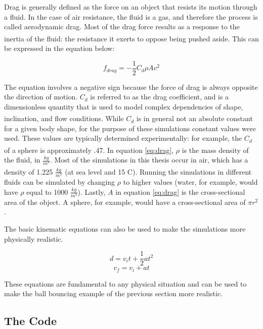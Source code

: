 Drag is generally defined as the force on an object that resists its motion through a fluid.  In the case of air resistance, the fluid is a gas, and therefore the process is called aerodynamic drag.  Most of the drag force results as a response to the inertia of the fluid: the resistance it exerts to oppose being pushed aside.\textsuperscript{\cite{universityphysics}}  This can be expressed in the equation below:

\begin{equation} \label{eq:drag}
f_{drag} = -\frac{1}{2}C_d \rho A v^2
\end{equation}

The equation involves a negative sign because the force of drag is always opposite the direction of motion.  $C_d$ is referred to as the drag coefficient, and is a dimensionless quantity that is used to model complex dependencies of shape, inclination, and flow conditions.\textsuperscript{\cite{universityphysics}}  While $C_d$ is in general not an absolute constant for a given body shape, for the purpose of these simulations constant values were used.  These values are typically determined experimentally: for example, the $C_d$ of a sphere is approximately .47.\textsuperscript{\cite{engineering}}  In equation \ref{eq:drag}, $\rho$ is the mass density of the fluid, in $\frac{kg}{m^3}$.  Most of the simulations in this thesis occur in air, which has a density of 1.225 $\frac{kg}{m^3}$  (at sea level and 15 \textdegree C).\textsuperscript{\cite{airfriction}}  Running the simulations in different fluids can be simulated by changing $\rho$ to higher values (water, for example, would have $\rho$ equal to 1000 $\frac{kg}{m^3}$).  Lastly, $A$ in equation \ref{eq:drag} is the cross-sectional area of the object.  A sphere, for example, would have a cross-sectional area of $\pi r^2 $. 

The basic kinematic equations can also be used to make the simulations more physically realistic.  

\begin{equation}\label{eq:position}
d = v_i t+ \frac{1}{2}at^2
\end{equation}
\begin{equation}\label{eq:v}
v_f = v_i + at
\end{equation}

These equations are fundamental to any physical situation and can be used to make the ball bouncing example of the previous section more realistic.

\subsection{The Code}

